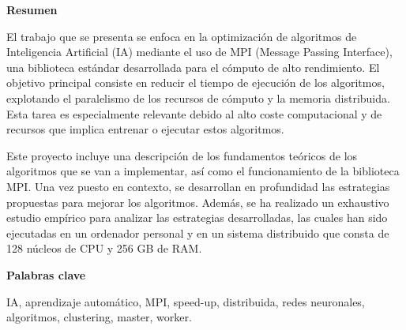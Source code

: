 
\newpage

\thispagestyle{empty}

\begin{center}

{\bf \Huge Resumen}

  \end{center}
\vspace{1cm}

El trabajo que se presenta se enfoca en la optimización de algoritmos de Inteligencia  Artificial (IA) mediante el uso de MPI (Message Passing Interface), una biblioteca estándar desarrollada para el cómputo de alto rendimiento. 
El objetivo principal consiste en reducir el tiempo de ejecución de los algoritmos, explotando el paralelismo de los recursos de cómputo y la memoria distribuida. Esta tarea es especialmente relevante debido al alto coste computacional y de recursos que implica entrenar o ejecutar estos algoritmos.

Este proyecto incluye una descripción de los fundamentos teóricos de los algoritmos que se van a implementar, así como el funcionamiento de la biblioteca MPI. 
Una vez puesto en contexto, se desarrollan en profundidad las estrategias propuestas para mejorar los algoritmos.
Además, se ha realizado un exhaustivo estudio empírico para analizar las estrategias desarrolladas, las cuales han sido ejecutadas en un ordenador personal y en un sistema distribuido que consta de 128 núcleos de CPU y 256 GB de RAM.



\vspace{1cm}


\begin{center}

{\bf \Large Palabras clave}

   \end{center}

   \vspace{0.5cm}
   
   IA, aprendizaje automático, MPI, speed-up, distribuida, redes neuronales, algoritmos, clustering, master, worker.
   
   


